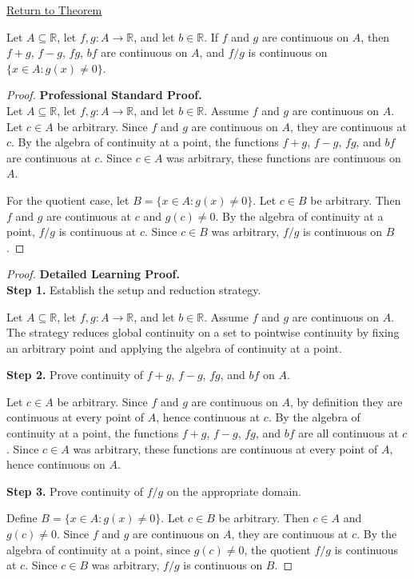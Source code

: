 \newpage
{}
\label{prf:algebra-of-continuity-on-a-set}

\begin{remark*}[Return]
\hyperref[thm:algebra-of-continuity-on-a-set]{Return to Theorem}
\end{remark*}

\begin{theorem*}
Let $A \subseteq \mathbb{R}$, let $f,g : A \to \mathbb{R}$, and let $b \in \mathbb{R}$. If $f$ and $g$ are continuous on $A$, then $f+g$, $f-g$, $fg$, $bf$ are continuous on $A$, and $f/g$ is continuous on $\{x \in A : g(x) \neq 0\}$.
\end{theorem*}

\begin{proof}
\textbf{Professional Standard Proof.}~\\
Let $A \subseteq \mathbb{R}$, let $f,g : A \to \mathbb{R}$, and let $b \in \mathbb{R}$. Assume $f$ and $g$ are continuous on $A$. Let $c \in A$ be arbitrary. Since $f$ and $g$ are continuous on $A$, they are continuous at $c$. By the algebra of continuity at a point, the functions $f+g$, $f-g$, $fg$, and $bf$ are continuous at $c$. Since $c \in A$ was arbitrary, these functions are continuous on $A$.

For the quotient case, let $B = \{x \in A : g(x) \neq 0\}$. Let $c \in B$ be arbitrary. Then $f$ and $g$ are continuous at $c$ and $g(c) \neq 0$. By the algebra of continuity at a point, $f/g$ is continuous at $c$. Since $c \in B$ was arbitrary, $f/g$ is continuous on $B$.
\end{proof}

\begin{proof}
\textbf{Detailed Learning Proof.}~\\

\textbf{Step 1.} Establish the setup and reduction strategy.

Let $A \subseteq \mathbb{R}$, let $f,g : A \to \mathbb{R}$, and let $b \in \mathbb{R}$. Assume $f$ and $g$ are continuous on $A$. The strategy reduces global continuity on a set to pointwise continuity by fixing an arbitrary point and applying the algebra of continuity at a point.

\textbf{Step 2.} Prove continuity of $f+g$, $f-g$, $fg$, and $bf$ on $A$.

Let $c \in A$ be arbitrary. Since $f$ and $g$ are continuous on $A$, by definition they are continuous at every point of $A$, hence continuous at $c$. By the algebra of continuity at a point, the functions $f+g$, $f-g$, $fg$, and $bf$ are all continuous at $c$. Since $c \in A$ was arbitrary, these functions are continuous at every point of $A$, hence continuous on $A$.

\textbf{Step 3.} Prove continuity of $f/g$ on the appropriate domain.

Define $B = \{x \in A : g(x) \neq 0\}$. Let $c \in B$ be arbitrary. Then $c \in A$ and $g(c) \neq 0$. Since $f$ and $g$ are continuous on $A$, they are continuous at $c$. By the algebra of continuity at a point, since $g(c) \neq 0$, the quotient $f/g$ is continuous at $c$. Since $c \in B$ was arbitrary, $f/g$ is continuous on $B$.
\end{proof}


